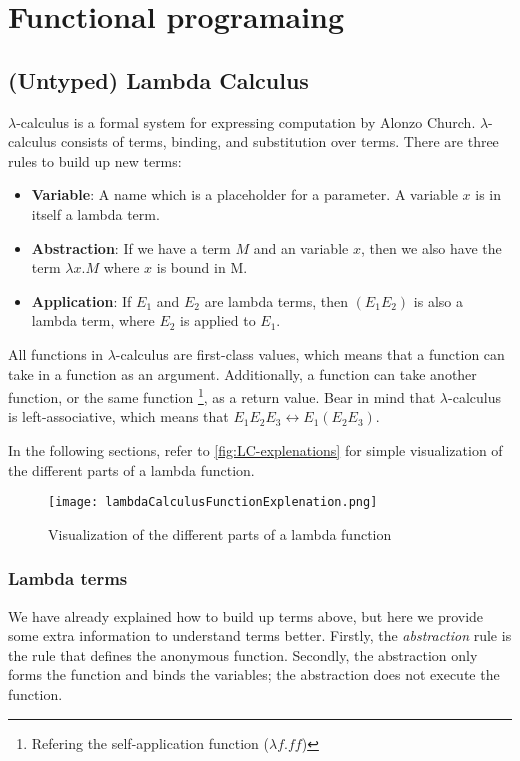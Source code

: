 \section{Functional programaing}

\subsection{(Untyped) Lambda Calculus}
\label{Lambda Calculus}
$\lambda$-calculus is a formal system for expressing computation by Alonzo Church. $\lambda$-calculus consists of terms, binding, and substitution over terms. There are three rules to build up new terms:

\begin{itemize}
    \item \textbf{Variable}: A name which  is a placeholder for a parameter. A variable $x$ is in itself a lambda term.
    \item \textbf{Abstraction}: If we have a term $M$ and an variable $x$, then we also have the term $\lambda x.M$ where $x$ is bound in M.
    \item \textbf{Application}: If $E_1$ and $E_2$ are lambda terms, then $(E_1 E_2) $ is also a lambda term, where $E_2$ is applied to $E_1$.
\end{itemize}

\para
All functions in $\lambda$-calculus are first-class values, which means that a function can take in a function as an argument. Additionally, a function can take another function, or the same function \footnote{Refering the self-application function ($\lambda f.ff$)}, as a return value. Bear in mind that $\lambda$-calculus is left-associative, which means that $E_1 E_2 E_3 \leftrightarrow E_1 (E_2 E_3)$.

\para
In the following sections, refer to \autoref{fig:LC-explenations} for simple visualization of the different parts of a lambda function. 
\begin{figure}
    \centering
    \texttt{[image: lambdaCalculusFunctionExplenation.png]}
    \caption{Visualization of the different parts of a lambda function}
    \label{fig:LC-explenations}
\end{figure}


\subsubsection{Lambda terms}
We have already explained how to build up terms above, but here we provide some extra information to understand terms better. Firstly, the \emph{abstraction} rule is the rule that defines the anonymous function. Secondly, the abstraction only forms the function and binds the variables; the abstraction does not execute the function. 

